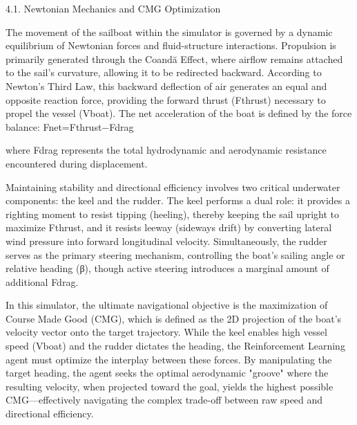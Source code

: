 4.1. Newtonian Mechanics and CMG Optimization

The movement of the sailboat within the simulator is governed by a dynamic equilibrium of Newtonian forces and fluid-structure interactions. Propulsion is primarily generated through the Coandă Effect, where airflow remains attached to the sail's curvature, allowing it to be redirected backward. According to Newton’s Third Law, this backward deflection of air generates an equal and opposite reaction force, providing the forward thrust (Fthrust​) necessary to propel the vessel (Vboat​). The net acceleration of the boat is defined by the force balance:
Fnet​=Fthrust​−Fdrag​

where Fdrag​ represents the total hydrodynamic and aerodynamic resistance encountered during displacement.

Maintaining stability and directional efficiency involves two critical underwater components: the keel and the rudder. The keel performs a dual role: it provides a righting moment to resist tipping (heeling), thereby keeping the sail upright to maximize Fthrust​, and it resists leeway (sideways drift) by converting lateral wind pressure into forward longitudinal velocity. Simultaneously, the rudder serves as the primary steering mechanism, controlling the boat’s sailing angle or relative heading (β), though active steering introduces a marginal amount of additional Fdrag​.

In this simulator, the ultimate navigational objective is the maximization of Course Made Good (CMG), which is defined as the 2D projection of the boat's velocity vector onto the target trajectory. While the keel enables high vessel speed (Vboat​) and the rudder dictates the heading, the Reinforcement Learning agent must optimize the interplay between these forces. By manipulating the target heading, the agent seeks the optimal aerodynamic "groove" where the resulting velocity, when projected toward the goal, yields the highest possible CMG—effectively navigating the complex trade-off between raw speed and directional efficiency.